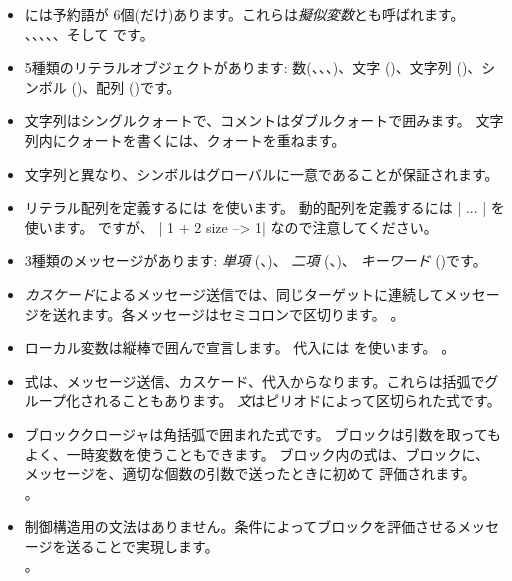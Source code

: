 \documentclass[a4paper,10pt,twoside]{book}
\begin{document}
\begin{itemize}

\item	\pharo には予約語が 6個(だけ)あります。これらは\textit{擬似変数}とも呼ばれます。 、、、、、そして です。

\item	5種類のリテラルオブジェクトがあります: 数(、、、)、文字 ()、文字列 ()、シンボル ()、配列 ()です。

\item	文字列はシングルクォートで、コメントはダブルクォートで囲みます。
		文字列内にクォートを書くには、クォートを重ねます。

\item	文字列と異なり、シンボルはグローバルに一意であることが保証されます。

\item	リテラル配列を定義するには  を使います。
		動的配列を定義するには \ct|{ ... }| を使います。
		 ですが、
		\ct|{ 1 + 2 } size --> 1|
		なので注意してください。

\item	3種類のメッセージがあります:
		\emph{単項} (\eg {}、)、
		\emph{二項} (\eg {}、)、
		\emph{キーワード} (\eg {})です。

\item	\emph{カスケード}によるメッセージ送信では、同じターゲットに連続してメッセージを送れます。各メッセージはセミコロンで区切ります。
。

\item	ローカル変数は縦棒で囲んで宣言します。
		代入には \ct{:=} を使います。
		。

\item	式は、メッセージ送信、カスケード、代入からなります。これらは括弧でグループ化されることもあります。
		\emph{文}はピリオドによって区切られた式です。

\item	ブロッククロージャは角括弧で囲まれた式です。
		ブロックは引数を取ってもよく、一時変数を使うこともできます。
		ブロック内の式は、ブロックに、 メッセージを、適切な個数の引数で送ったときに初めて
		評価されます。\\
		。

\item	制御構造用の文法はありません。条件によってブロックを評価させるメッセージを送ることで実現します。\\
 		。

\end{itemize}

\ifx\wholebook\relax\else
\end{document}
